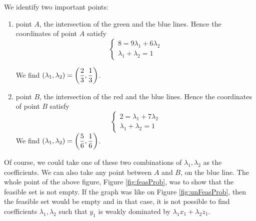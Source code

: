   


\begin{center}
    
    \label{fig:feasProb}
\end{center}


We identify two important points:
\begin{enumerate}
    \item point $A$, the intersection of the green and the blue lines. Hence the coordinates of point $A$ satisfy
    \begin{equation*}
       \begin{cases}
        8 = 9 \lambda_{1} + 6 \lambda_{2}  \\
        \lambda_{1} + \lambda_{2} = 1
        \end{cases} 
    \end{equation*}
    
    We find $\left( \lambda_{1},\lambda_{2} \right) = \left( \dfrac{2}{3},\dfrac{1}{3} \right) $.
    
    \item point $B$, the intersection of the red and the blue lines. Hence the coordinates of point $B$ satisfy
    \begin{equation*}
    \begin{cases}
    2 = \lambda_{1} + 7 \lambda_{2}  \\
    \lambda_{1} + \lambda_{2} = 1
    \end{cases}
    \end{equation*}
    We find $\left( \lambda_{1},\lambda_{2} \right) = \left( \dfrac{5}{6},\dfrac{1}{6} \right) $.
\end{enumerate}
    
Of course, we could take one of these two combinations of $\lambda_{1},\lambda_{2}$ as the coefficients. We can also take any point between $A$ and $B$, on the blue line. The whole point of the above figure, Figure \ref{fig:feasProb}, was to show that the feasible set is not empty. If the graph was like on Figure \ref{fig:unFeasProb}, then the feasible set would be empty and in that case, it is not possible to find coefficients $\lambda_{1},\lambda_{2}$ such that $y_1$ is weakly dominated by $\lambda_{1} x_{1} + \lambda_{2} z_{1}$.


\begin{center}
    \centering
    
    \label{fig:unFeasProb}
\end{center}


